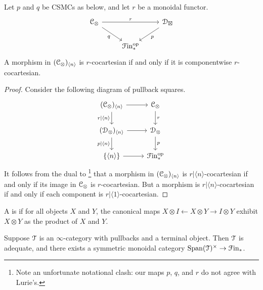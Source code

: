 \documentclass[main.tex]{subfiles}
\begin{document}
\begin{lemma}
  \label{lemma:cocartesian_iff_componentwise_cocartesian}
  Let $p$ and $q$ be CSMCs as below, and let $r$ be a monoidal functor.
  \begin{equation*}
    \begin{tikzcd}
      \category{C}_{\otimes}
      \arrow[rr, "r"]
      \arrow[dr, swap, "q"]
      && \category{D}_{\boxtimes}
      \arrow[dl, "p"]
      \\
      & \Finp\op
    \end{tikzcd}
  \end{equation*}
  A morphism in $(\mathcal{C}_{\otimes})_{\langle n \rangle}$ is $r$-cocartesian if and only if it is componentwise $r$-cocartesian.
\end{lemma}
\begin{proof}
  Consider the following diagram of pullback squares.
  \begin{equation*}
    \begin{tikzcd}
      (\category{C}_{\otimes})_{\langle n \rangle}
      \arrow[r]
      \arrow[d, swap, "r|\langle n \rangle"]
      & \category{C}_{\otimes}
      \arrow[d, "r"]
      \\
      (\category{D}_{\otimes})_{\langle n \rangle}
      \arrow[r]
      \arrow[d, swap, "p|\langle n \rangle"]
      & \category{D}_{\otimes}
      \arrow[d, "p"]
      \\
      \{\langle n \rangle\}
      \arrow[r]
      & \Finp\op
    \end{tikzcd}
  \end{equation*}
  It follows from the dual to \cite[Cor.~4.3.1.15]{highertopostheory}\footnote{Note an unfortunate notational clash: our maps $p$, $q$, and $r$ do not agree with Lurie's.} that a morphism in $(\mathcal{C}_{\otimes})_{\langle n \rangle}$ is $r|\langle n \rangle$-cocartesian if and only if its image in $\mathcal{C}_{\otimes}$ is $r$-cocartesian. But a morphism is $r|\langle n \rangle$-cocartesian if and only if each component is $r|\langle 1 \rangle$-cocartesian.
\end{proof}

\begin{definition}
  A  is  if for all objects $X$ and $Y$, the canonical maps $X \otimes I \leftarrow X \otimes Y \to I \otimes Y$ exhibit $X \otimes Y$ as the product of $X$ and $Y$.
\end{definition}

\begin{proposition}
  Suppose $\mathcal{T}$ is an $\infty$-category with pullbacks and a terminal object. Then $\mathcal{T}$ is adequate, and there exists a symmetric monoidal category $\mathrm{Span}(\mathcal{T})^{\times} \to \mathcal{F}\mathrm{in}_{*}$.
\end{proposition}
\end{document}
